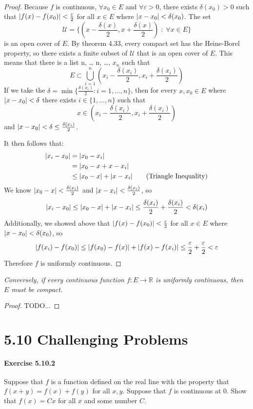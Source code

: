 \documentclass[11pt]{article}
\DeclarePairedDelimiter{\abs}{\lvert}{\rvert}
\newcommand\textlist[3][\cr]{%
	\readlist\indices{#3}%
	\foreachitem\x\in\indices{%
		\ifnum\xcnt=1\else, \fi$#2_{\x}$%
	}%
	\ifx\cr#1\relax, \ldots\else%
	\if\relax#1\relax\else, \ldots, $#2_{#1}$\fi%
	\fi%
}
\def \R {\mathbb{R}}
\def \scriptU {\mathcal{U}}
\newcommand{\half}[1]{\frac{#1}{2}}
\def \epsilon {\varepsilon}
\def \halfepsilon {\frac{\epsilon}{2}}
\newcommand{\set}[1]{\{#1\}}
\begin{document}
\def \xihalfdeltainterval {\left(x_i - \half{\delta(x_i)}, x_i + \half{\delta(x_i)} \right)}
\begin{proof}
	Because $f$ is continuous, $\forall x_0 \in E$ and $\forall \epsilon > 0$, there exists $ \delta(x_0) > 0$ such that $\abs{f(x) - f(x_0)} < \halfepsilon$ for all $x \in E$ where $\abs{x - x_0} < \delta(x_0)$.
	The set 
		$$\scriptU = \set{(x - \half{\delta(x)}, x + \half{\delta(x)}) \; : \; \forall x \in E}$$ 
	is an open cover of $E$. By theorem 4.33, every compact set has the Heine-Borel property, so there exists a finite subset of $\scriptU$ that is an open cover of $E$. This means that there is a list \textlist[n]{x}{1, 2} such that 
		$$E \subset \bigcup\limits_{i=1}^{n} \xihalfdeltainterval$$
	If we take the $\delta = \min \set{\half{\delta(x_i)} : i = 1, \dots, n} $, then for every $x, x_0 \in E$ where $\abs{x - x_0} < \delta$ there exists $i \in \set{1, \dots, n}$ such that 
		$$ x \in \xihalfdeltainterval$$		
	and $\abs{x - x_0} < \delta \leq \half{\delta(x_i)}$. 
	
	It then follows that: 
	\begin{align*}
		\abs{x_i - x_0} &= \abs{x_0 - x_i} \\
					&= \abs{x_0 - x + x - x_i} \\
					&\leq \abs{x_0 - x} + \abs{x - x_i} \tag{Triangle Inequality}
	\end{align*}
	We know $ \abs{x_0 - x} < \half{\delta(x_i)}$ and $ \abs{x - x_i} < \half{\delta(x_i)}$, so 
		$$\abs{x_i - x_0} \leq \abs{x_0 - x} + \abs{x - x_i} \leq \half{\delta(x_i)} + \half{\delta(x_i)} < \delta(x_i) $$
	Additionally, we showed above that $\abs{f(x) - f(x_0)} < \halfepsilon$ for all $x \in E$ where $\abs{x - x_0} < \delta(x_0)$, so
		$$\abs{f(x_i) - f(x_0)} \leq \abs{f(x_0) - f(x)} + \abs{f(x) - f(x_i)} \leq \halfepsilon + \halfepsilon < \epsilon $$
	Therefore $f$ is uniformly continuous. 
\end{proof}

\textit{Conversely, if every continuous function $f:E \to \R$ is uniformly continuous, then $E$ must be compact.}

\begin{proof}
%	
%	
%	
	TODO...
	
	
\end{proof}



\section*{5.10 Challenging Problems}
\paragraph{Exercise 5.10.2} Suppose that $f$ is a function defined on the real line with the property that $f(x+y) = f(x) + f(y)$ for all $x,y$.
Suppose that $f$ is continuous at 0.
Show that $f(x) = Cx$ for all $x$ and some number $C$.
\end{document}
